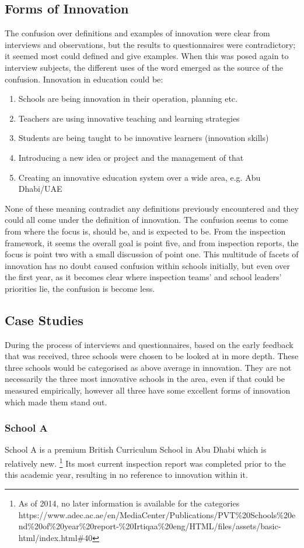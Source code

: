 \subsection{Forms of Innovation}

The confusion over definitions and examples of innovation were clear from interviews and observations, but the results to questionnaires were contradictory; it seemed most could defined and give examples.
When this was posed again to interview subjects, the different uses of the word emerged as the source of the confusion.
Innovation in education could be:
\begin{enumerate}
\item Schools are being innovation in their operation, planning etc.
\item Teachers are using innovative teaching and learning strategies 
\item Students are being taught to be innovative learners (innovation skills)
\item Introducing a new idea or project and the management of that
\item Creating an innovative education system over a wide area, e.g. Abu Dhabi/UAE
\end{enumerate}
None of these meaning contradict any definitions previously encountered and they could all come under the definition of innovation. The confusion seems to come from where the focus is, should be, and is expected to be. 
From the inspection framework, it seems the overall goal is point five, and from inspection reports, the focus is point two with a small discussion of point one.
This multitude of facets of innovation has no doubt caused confusion within schools initially, but even over the first year, as it becomes clear where inspection teams’ and school leaders’ priorities lie, the confusion is become less.


\subsection{Case Studies}
During the process of interviews and questionnaires, based on the early feedback that was received, three schools were chosen to be looked at in more depth. These three schools would be categorised as above average in innovation. They are not necessarily the three most innovative schools in the area, even if that could be measured empirically, however all three have some excellent forms of innovation which made them stand out.

\subsubsection{School A}
School A is a premium British Curriculum School in Abu Dhabi which is relatively new. \footnote{As of 2014, no later information is available for the categories https://www.adec.ac.ae/en/MediaCenter/Publications/PVT\%20Schools\%20end\%20of\%20year\%20report-\%20Irtiqaa\%20eng/HTML/files/assets/basic-html/index.html\#40}  Its most current inspection report was completed prior to the this academic year, resulting in no reference to innovation within it.

